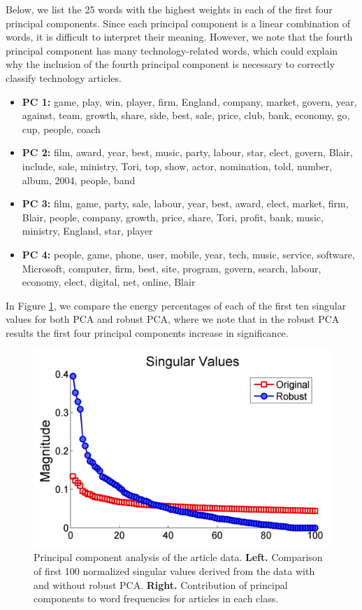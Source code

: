 \documentclass[12pt]{article}
\begin{document}
Below, we list the 25 words with the highest weights in each of the first four principal components. Since each principal component is a linear combination of words, it is difficult to interpret their meaning. However, we note that the fourth principal
component has many technology-related words, which could explain why the inclusion of the fourth principal component is necessary to correctly classify technology articles.

\begin{itemize}
\item {\bf PC 1:} game, play, win, player, firm, England, company, market, govern, year, against, team, growth, share, side, best, sale, price, club, bank, economy, go, cup, people, coach
\item {\bf PC 2:} film, award, year, best, music, party, labour, star, elect, govern, Blair, include, sale, ministry, Tori, top, show, actor, nomination, told, number, album, 2004, people, band
\item {\bf PC 3:}  film, game, party, sale, labour, year, best, award, elect, market, firm, Blair, people, company, growth, price, share, Tori, profit, bank, music, ministry, England, star, player
\item {\bf PC 4:} people, game, phone, user, mobile, year, tech, music, service, software, Microsoft, computer, firm, best, site, program, govern, search, labour, economy, elect, digital,
net, online, Blair
\end{itemize}

In Figure \ref{sing_val}, we compare the energy percentages of each of the first ten singular values for both PCA and robust PCA, where we note that in the robust PCA results the first four principal components increase in significance.

\begin{figure}[H]
\centering
\includegraphics[width=.6\textwidth]{figures/singularvaluescompare}
\caption{Principal component analysis of the article data. {\bf Left.} Comparison of first 100 normalized singular values derived from the data with and without robust PCA.
{\bf Right.} Contribution of principal components to word frequencies for articles in each class.}
\label{sing_val}
\end{figure}
\end{document}
